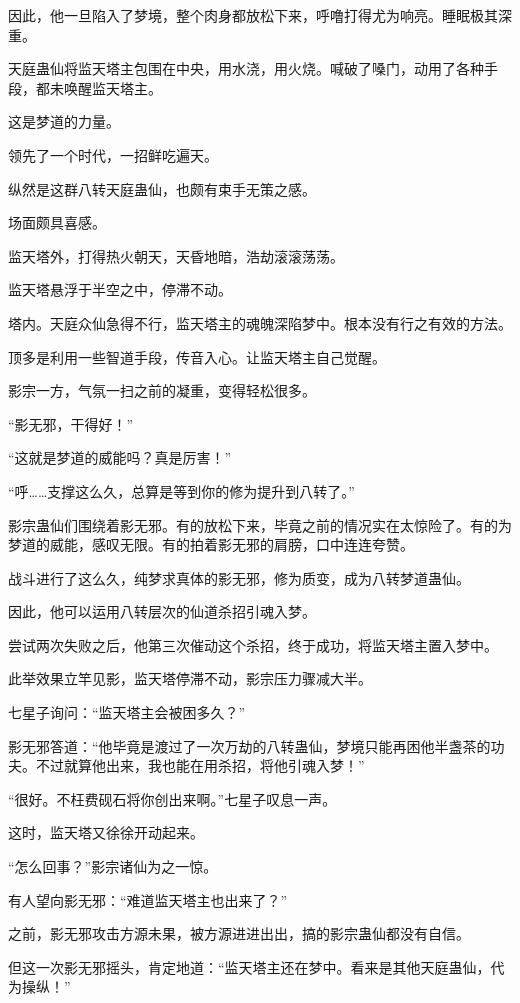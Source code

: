 \begin{this_body}
因此，他一旦陷入了梦境，整个肉身都放松下来，呼噜打得尤为响亮。睡眠极其深重。

天庭蛊仙将监天塔主包围在中央，用水浇，用火烧。喊破了嗓门，动用了各种手段，都未唤醒监天塔主。

这是梦道的力量。

领先了一个时代，一招鲜吃遍天。

纵然是这群八转天庭蛊仙，也颇有束手无策之感。

场面颇具喜感。

监天塔外，打得热火朝天，天昏地暗，浩劫滚滚荡荡。

监天塔悬浮于半空之中，停滞不动。

塔内。天庭众仙急得不行，监天塔主的魂魄深陷梦中。根本没有行之有效的方法。

顶多是利用一些智道手段，传音入心。让监天塔主自己觉醒。

影宗一方，气氛一扫之前的凝重，变得轻松很多。

“影无邪，干得好！”

“这就是梦道的威能吗？真是厉害！”

“呼……支撑这么久，总算是等到你的修为提升到八转了。”

影宗蛊仙们围绕着影无邪。有的放松下来，毕竟之前的情况实在太惊险了。有的为梦道的威能，感叹无限。有的拍着影无邪的肩膀，口中连连夸赞。

战斗进行了这么久，纯梦求真体的影无邪，修为质变，成为八转梦道蛊仙。

因此，他可以运用八转层次的仙道杀招引魂入梦。

尝试两次失败之后，他第三次催动这个杀招，终于成功，将监天塔主置入梦中。

此举效果立竿见影，监天塔停滞不动，影宗压力骤减大半。

七星子询问：“监天塔主会被困多久？”

影无邪答道：“他毕竟是渡过了一次万劫的八转蛊仙，梦境只能再困他半盏茶的功夫。不过就算他出来，我也能在用杀招，将他引魂入梦！”

“很好。不枉费砚石将你创出来啊。”七星子叹息一声。

这时，监天塔又徐徐开动起来。

“怎么回事？”影宗诸仙为之一惊。

有人望向影无邪：“难道监天塔主也出来了？”

之前，影无邪攻击方源未果，被方源进进出出，搞的影宗蛊仙都没有自信。

但这一次影无邪摇头，肯定地道：“监天塔主还在梦中。看来是其他天庭蛊仙，代为操纵！”


\end{this_body}
